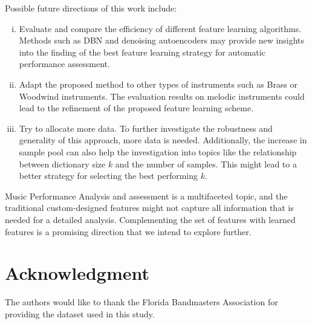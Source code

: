 \documentclass[conference]{IEEEtran}
\begin{document}
Possible future directions of this work include: 
\begin{enumerate}[(i)]
    \item   Evaluate and compare the efficiency of different feature learning algorithms. Methods such as DBN\cite{Hamel2010} and denoising autoencoders \cite{Vincent2008} may provide new insights into the finding of the best feature learning strategy for automatic performance assessment.
    \item   Adapt the proposed method to other types of instruments such as Brass or Woodwind instruments. The evaluation results on melodic instruments could lead to the refinement of the proposed feature learning scheme. 
    \item   Try to allocate more data. To further investigate the robustness and generality of this approach, more data is needed. Additionally, the increase in sample pool can also help the investigation into topics like the relationship between dictionary size $k$ and the number of samples. This might lead to a better strategy for selecting the best performing $k$. 
\end{enumerate}

Music Performance Analysis and assessment is a multifaceted topic, and the traditional custom-designed features might not capture all information that is needed for a detailed analysis. Complementing the set of features with learned features is a promising direction that we intend to explore further.



\section*{Acknowledgment}

The authors would like to thank the Florida Bandmasters Association for providing the dataset used in this study.



%
%
%




\end{document}
